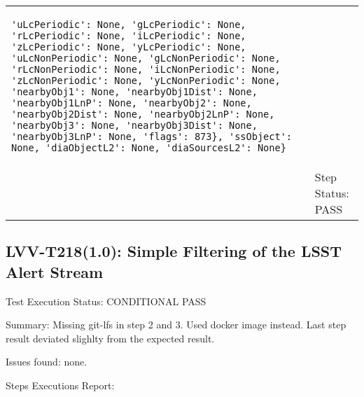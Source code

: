 \documentclass[DM,lsstdraft,STR,toc]{lsstdoc}
\begin{document}
\begin{longtable}{p{2cm}p{14cm}}
\begin{verbatim}
'uLcPeriodic': None, 'gLcPeriodic': None, 'rLcPeriodic': None, 'iLcPeriodic': None, 'zLcPeriodic': None, 'yLcPeriodic': None, 'uLcNonPeriodic': None, 'gLcNonPeriodic': None, 'rLcNonPeriodic': None, 'iLcNonPeriodic': None, 'zLcNonPeriodic': None, 'yLcNonPeriodic': None, 'nearbyObj1': None, 'nearbyObj1Dist': None, 'nearbyObj1LnP': None, 'nearbyObj2': None, 'nearbyObj2Dist': None, 'nearbyObj2LnP': None, 'nearbyObj3': None, 'nearbyObj3Dist': None, 'nearbyObj3LnP': None, 'flags': 873}, 'ssObject': None, 'diaObjectL2': None, 'diaSourcesL2': None}

\end{verbatim}

 \\\cline{2-2}
  & Step Status: PASS \\\hline
\end{longtable}




\subsection{LVV-T218(1.0): Simple Filtering of the LSST Alert Stream}
\label{sect:detail-lvv-t216}

Test Execution Status: CONDITIONAL PASS

Summary: Missing git-lfs in step 2 and 3. Used docker image instead. Last step result deviated slighlty from the expected result.

Issues found: none.

Steps Executions Report:
\end{document}
